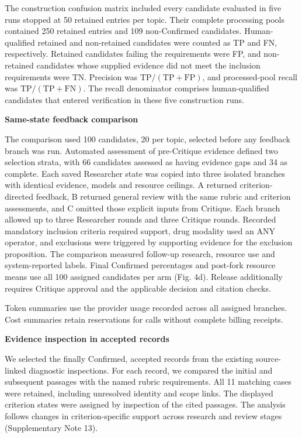 \documentclass[
]{article}
\begin{document}
The construction confusion matrix included every candidate evaluated in five runs stopped at 50 retained entries per topic. Their complete processing pools contained 250 retained entries and 109 non-Confirmed candidates. Human-qualified retained and non-retained candidates were counted as TP and FN, respectively. Retained candidates failing the requirements were FP, and non-retained candidates whose supplied evidence did not meet the inclusion requirements were TN. Precision was $\mathrm{TP}/(\mathrm{TP}+\mathrm{FP})$, and processed-pool recall was $\mathrm{TP}/(\mathrm{TP}+\mathrm{FN})$. The recall denominator comprises human-qualified candidates that entered verification in these five construction runs.

\textbf{Same-state feedback comparison}

The comparison used 100 candidates, 20 per topic, selected before any feedback branch was run. Automated assessment of pre-Critique evidence defined two selection strata, with 66 candidates assessed as having evidence gaps and 34 as complete. Each saved Researcher state was copied into three isolated branches with identical evidence, models and resource ceilings. A returned criterion-directed feedback, B returned general review with the same rubric and criterion assessments, and C omitted those explicit inputs from Critique. Each branch allowed up to three Researcher rounds and three Critique rounds. Recorded mandatory inclusion criteria required support, drug modality used an ANY operator, and exclusions were triggered by supporting evidence for the exclusion proposition. The comparison measured follow-up research, resource use and system-reported labels. Final Confirmed percentages and post-fork resource means use all 100 assigned candidates per arm (Fig. 4d). Release additionally requires Critique approval and the applicable decision and citation checks.

Token summaries use the provider usage recorded across all assigned branches. Cost summaries retain reservations for calls without complete billing receipts.

\textbf{Evidence inspection in accepted records}

We selected the finally Confirmed, accepted records from the existing source-linked diagnostic inspections. For each record, we compared the initial and subsequent passages with the named rubric requirements. All 11 matching cases were retained, including unresolved identity and scope links. The displayed criterion states were assigned by inspection of the cited passages. The analysis follows changes in criterion-specific support across research and review stages (Supplementary Note 13).
\end{document}

